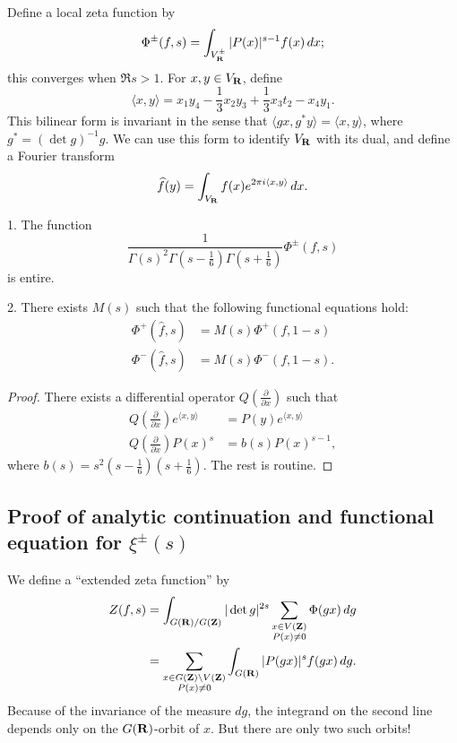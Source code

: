 Define a local zeta function by 
\[
  \Phi^\pm(f,s) = \int_{V_{\mathbf{R}}^\pm} |P(x)|^{s-1} f(x)\, dx ;
\]
this converges when $\Re s>1$. For $x,y\in V_{\mathbf{R}}$, define 
\[
  \langle x,y\rangle = x_1 y_4 - \frac 1 3 x_2 y_3 + \frac 1 3 x_3 t_2 - x_4 y_1 .
\]
This bilinear form is invariant in the sense that 
$\langle g x,g^\ast y\rangle = \langle x,y\rangle$, where 
$g^\ast = (\det g)^{-1} g$. We can use this form to identify $V_{\mathbf{R}}$ with its 
dual, and define a Fourier transform 
\[
  \widehat f(y) = \int_{V_{\mathbf{R}}} f(x) e^{2\pi i \langle x,y\rangle} \, dx .
\]

\begin{prop}
1. The function 
\[
  \frac{1}{\Gamma(s)^2 \Gamma(s-\frac 1 6) \Gamma(s+\frac 1 6)} \Phi^\pm(f,s) 
\]
is entire. 

2. There exists $M(s)$ such that the following functional equations hold:
\begin{align*}
  \Phi^+(\widehat f,s) &= M(s) \Phi^+(f,1-s) \\
  \Phi^-(\widehat f,s) &= M(s) \Phi^-(f,1-s) .
\end{align*}
\end{prop}
\begin{proof}
There exists a differential operator $Q(\frac{\partial}{\partial x})$ such that 
\begin{align*}
  Q\left(\frac{\partial}{\partial x}\right) e^{\langle x,y\rangle} &= P(y) e^{\langle x,y\rangle} \\
  Q\left(\frac{\partial}{\partial x}\right) P(x)^s &= b(s) P(x)^{s-1} ,
\end{align*}
where $b(s) = s^2 (s-\frac 1 6)(s+\frac 1 6)$. The rest is routine. 
\end{proof}





\subsection{Proof of analytic continuation and functional equation for \texorpdfstring{$\xi^\pm(s)$}{xi}}

We define a ``extended zeta function'' by 
\begin{align*}
  Z(f,s) 
    &= \int_{G(\mathbf{R})/G(\mathbf{Z})} |\det g|^{2 s} \sum_{\substack{x\in V(\mathbf{Z}) \\ P(x)\ne 0}} \Phi(g x)\, dg \\
    &= \sum_{\substack{x\in G(\mathbf{Z})\backslash V(\mathbf{Z}) \\ P(x)\ne 0}} \int_{G(\mathbf{R})} |P(g x)|^s f(g x)\, d g .
\end{align*}
Because of the invariance of the measure $d g$, the integrand on the second 
line depends only on the $G(\mathbf{R})$-orbit of $x$. But there are only two such 
orbits! 

